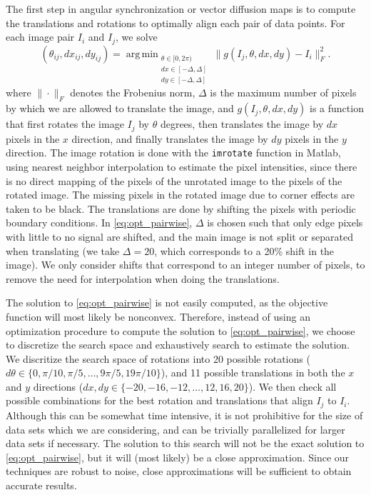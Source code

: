 \documentclass{pnastwo}
\DeclareMathOperator*{\argmin}{arg\,min}
\begin{document}
\begin{article}
\begin{materials}
The first step in angular synchronization or vector diffusion maps is to compute the translations and rotations to optimally align each pair of data points. 
%
For each image pair $I_i$ and $I_j$, we solve
\begin{equation}\label{eq:opt_pairwise}
(\theta_{ij}, dx_{ij}, dy_{ij}) = \argmin_{
\begin{matrix}
\theta \in [0, 2\pi) \\ 
dx \in [-\Delta, \Delta]\\ 
dy \in [-\Delta, \Delta]
\end{matrix}
} \|g(I_j, \theta, dx, dy) - I_i \|_F^2.
\end{equation}
where $\| \cdot \|_F$ denotes the Frobenius norm, $\Delta$ is the maximum number of pixels by which we are allowed to translate the image, and $g(I_j, \theta, dx, dy)$ is a function that first rotates the image $I_j$ by $\theta$ degrees, then translates the image by $dx$ pixels in the $x$ direction, and finally translates the image by $dy$ pixels in the $y$ direction. 
%
The image rotation is done with the \texttt{imrotate} function in Matlab, using nearest neighbor interpolation to estimate the pixel intensities, since there is no direct mapping of the pixels of the unrotated image to the pixels of the rotated image.
%
The missing pixels in the rotated image due to corner effects are taken to be black.
%
The translations are done by shifting the pixels with periodic boundary conditions.
%
In \eqref{eq:opt_pairwise}, $\Delta$ is chosen such that only edge pixels with little to no signal are shifted, and the main image is not split or separated when translating (we take $\Delta=20$, which corresponds to a 20\% shift in the image).
%
We only consider shifts that correspond to an integer number of pixels, to remove the need for interpolation when doing the translations.  

The solution to \eqref{eq:opt_pairwise} is not easily computed, as the objective function will most likely be nonconvex.
%
Therefore, instead of using an optimization procedure to compute the solution to \eqref{eq:opt_pairwise}, we choose to discretize the search space and exhaustively search to estimate the solution.
%
We discritize the search space of rotations into 20 possible rotations ($d\theta  \in \{0, \pi/10, \pi/5, \dots, 9 \pi/5, 19\pi/10 \}$), and 11 possible translations in both the $x$ and $y$ directions ($dx, dy \in \{-20, -16, -12, \dots, 12, 16, 20 \}$). 
%
We then check all possible combinations for the best rotation and translations that align $I_j$ to $I_i$. 
%
Although this can be somewhat time intensive, it is not prohibitive for the size of data sets which we are considering, and can be trivially parallelized for larger data sets if necessary.
%
The solution to this search will not be the exact solution to \eqref{eq:opt_pairwise}, but it will (most likely) be a close approximation.
%
Since our techniques are robust to noise, close approximations will be sufficient to obtain accurate results.


\end{materials}
\end{article}
\end{document}

